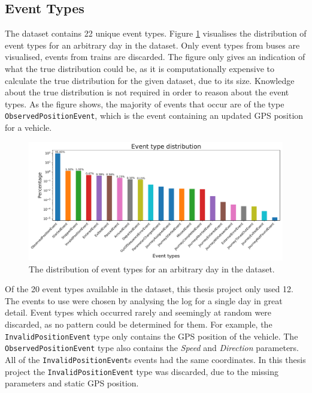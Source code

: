 \subsection{Event Types}
The dataset contains 22 unique event types.
Figure \ref{fig:types-barplot} visualises the distribution of event types for an arbitrary day  in the dataset.
Only event types from buses are visualised, events from trains are discarded.
The figure only gives an indication of what the true distribution could be, as it is computationally expensive to calculate the true distribution for the given dataset, due to its size.
Knowledge about the true distribution is not required in order to reason about the event types.
As the figure shows, the majority of events that occur are of the type \texttt{ObservedPositionEvent}, which is the event containing an updated GPS position for a vehicle.

\begin{figure}[ht!]
    \centering
    \includegraphics[width=\textwidth]{figures/types_barplot}
    \caption{The distribution of event types for an arbitrary day in the dataset.}
    \label{fig:types-barplot}
\end{figure}

Of the 20 event types available in the dataset, this thesis project only used 12.
The events to use were chosen by analysing the log for a single day in great detail.
Event types which occurred rarely and seemingly at random were discarded, as no pattern could be determined for them.
For example, the \texttt{InvalidPositionEvent} type only contains the GPS position of the vehicle.
The \texttt{ObservedPositionEvent} type also contains the \textit{Speed} and \textit{Direction} parameters.
All of the \texttt{InvalidPositionEvent}s events had the same coordinates.
In this thesis project the \texttt{InvalidPositionEvent} type was discarded, due to the missing parameters and static GPS position.


